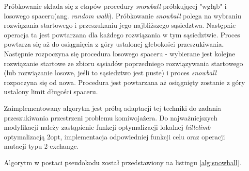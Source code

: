 Próbkowanie składa się z etapów procedury \textit{snowball} próbkującej "wgłąb" i losowego spaceru(ang. \textit{random walk}).
Próbkowanie \textit{snowball} polega na wybraniu rozwiązania startowego i przeszukaniu jego najbliższego sąsiedztwa.
Następnie operacja ta jest powtarzana dla każdego rozwiązania w tym sąsiedztwie. Proces powtarza się aż do osiągnięcia z góry ustalonej głebokości
przeszukiwania. Następnie rozpoczyna się procedura losowego spaceru - wybierane jest kolejne rozwiązanie startowe
ze zbioru sąsiadów poprzedniego rozwiązywania startowego (lub rozwiązanie losowe, jeśli to sąsiedztwo jest puste) i proces \textit{snowball}
rozpoczyna się od nowa. Procedura jest powtarzana aż osiągnięty zostanie z góry ustalony limit długości spaceru.

Zaimplementowany algorytm jest próbą adaptacji tej techniki do zadania przeszukiwania przestrzeni
problemu komiwojażera. Do najważniejszych modyfikacji należy zastąpienie funkcji optymalizacji lokalnej \textit{hillclimb}
optymalizacją 2opt, implementacja odpowiedniej funkcji celu oraz operacji mutacji typu 2-exchange.

Algorytm w postaci pseudokodu został przedstawiony na listingu \ref{alg:snowball}.

